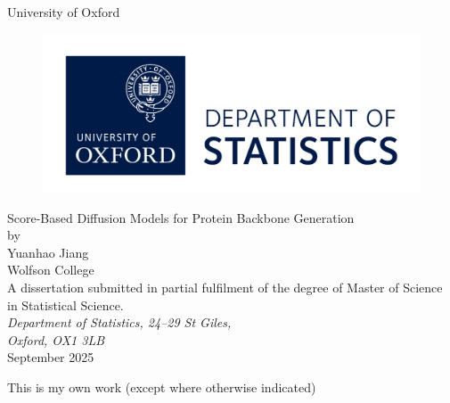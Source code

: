 \documentclass[a4paper,12pt]{article}
\begin{document}

\begin{titlepage}
\begin{center}
\vspace{1cm}
\textsf{\Huge{University of Oxford \\}}
\vspace{1cm}
\begin{figure}[htb]
\centering
\includegraphics[scale=.8]{stats_logo_RGB.jpg}
\end{figure}
\vspace{2.0cm}
\Huge{Score-Based Diffusion Models for Protein Backbone Generation\\}
\vspace{2.0cm}
\large{ by \\[14pt] Yuanhao Jiang \\[8pt] Wolfson College} \\
\vspace{2.2cm}
\large{A dissertation submitted in partial fulfilment of the degree of Master of Science in Statistical Science.
} \\
\vspace{.5cm}
\large{\emph{Department of Statistics, 24--29 St Giles, \\Oxford, OX1 3LB}} \\
\vspace{1.0cm}
\large{September 2025} \\
\end{center}
\end{titlepage}
\clearpage

This is my own work (except where otherwise indicated)
\vspace{2.5in}
\end{document}
